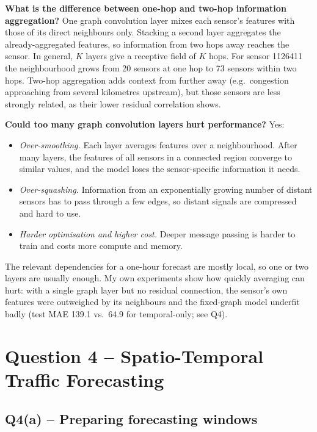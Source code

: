\documentclass[11pt, a4paper]{article}
\begin{document}
\textbf{What is the difference between one-hop and two-hop information aggregation?} One graph convolution layer mixes each sensor's features with those of its direct neighbours only. Stacking a second layer aggregates the already-aggregated features, so information from two hops away reaches the sensor. In general, $K$ layers give a receptive field of $K$ hops. For sensor 1126411 the neighbourhood grows from 20 sensors at one hop to 73 sensors within two hops. Two-hop aggregation adds context from further away (e.g.\ congestion approaching from several kilometres upstream), but those sensors are less strongly related, as their lower residual correlation shows.

\textbf{Could too many graph convolution layers hurt performance?} Yes:
\begin{itemize}
\item \emph{Over-smoothing.} Each layer averages features over a neighbourhood. After many layers, the features of all sensors in a connected region converge to similar values, and the model loses the sensor-specific information it needs.
\item \emph{Over-squashing.} Information from an exponentially growing number of distant sensors has to pass through a few edges, so distant signals are compressed and hard to use.
\item \emph{Harder optimisation and higher cost.} Deeper message passing is harder to train and costs more compute and memory.
\end{itemize}
The relevant dependencies for a one-hour forecast are mostly local, so one or two layers are usually enough. My own experiments show how quickly averaging can hurt: with a single graph layer but no residual connection, the sensor's own features were outweighed by its neighbours and the fixed-graph model underfit badly (test MAE 139.1 vs.\ 64.9 for temporal-only; see Q4).

\section*{Question 4 -- Spatio-Temporal Traffic Forecasting}

\subsection*{Q4(a) -- Preparing forecasting windows}
\end{document}
